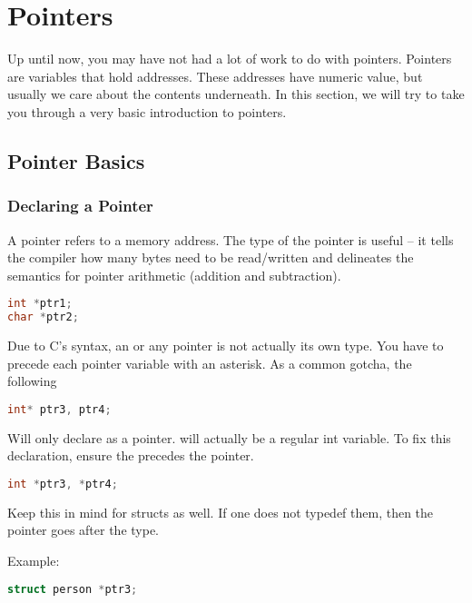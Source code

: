 \section{Pointers}

Up until now, you may have not had a lot of work to do with pointers. Pointers are variables that hold addresses.
These addresses have numeric value, but usually we care about the contents underneath.
In this section, we will try to take you through a very basic introduction to pointers.

\subsection{Pointer Basics}

\subsubsection{Declaring a Pointer}

A pointer refers to a memory address. The type of the pointer is useful -- it tells the compiler how many bytes need to be read/written and delineates the semantics for pointer arithmetic (addition and subtraction).

\begin{lstlisting}[language=C]
int *ptr1;
char *ptr2;
\end{lstlisting}

Due to C's syntax, an  or any pointer is not actually its own type. You have to precede each pointer variable with an asterisk. As a common gotcha, the following

\begin{lstlisting}[language=C]
int* ptr3, ptr4;
\end{lstlisting}

Will only declare  as a pointer.
 will actually be a regular int variable.
To fix this declaration, ensure the \keyword{*} precedes the pointer.

\begin{lstlisting}[language=C]
int *ptr3, *ptr4;
\end{lstlisting}

Keep this in mind for structs as well.
If one does not typedef them, then the pointer goes after the type.

Example:

\begin{lstlisting}[language=C]
struct person *ptr3;
\end{lstlisting}

